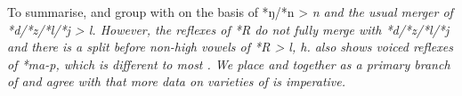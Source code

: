 To summarise,
 and  group with  on the basis of
*ŋ/*n > \it{n} and the usual merger of *d/*z/*l/*j > \it{l.} However,
the reflexes of *R do not fully merge with *d/*z/*l/*j
and there is a split before non-high vowels of *R > \it{l, h}.
 also shows voiced reflexes of *ma-p,
which is different to most .
We place  and  together as a primary branch of 
and agree with \citet[135]{Collins1986} that more data on varieties
of  is imperative.
